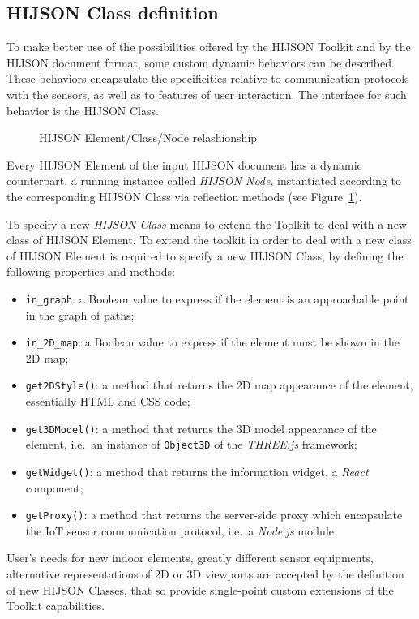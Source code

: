 \subsection{HIJSON Class definition}\label{hijson-class-definition}

To make better use of the possibilities offered by the HIJSON Toolkit and by the
HIJSON document format, some custom dynamic behaviors can be described. These
behaviors encapsulate the specificities relative to communication
protocols with the sensors, as well as to features of user interaction. The
interface for such behavior is the HIJSON Class.

\begin{figure}[!h]
\centering
{}
\caption{HIJSON Element/Class/Node relashionship}
\label{fig:elem-class-node-rel}
\end{figure}

Every HIJSON Element of the input HIJSON document has a dynamic
counterpart, a running instance called \emph{HIJSON Node}, instantiated
according to the corresponding HIJSON Class via reflection methods (see
Figure~\ref{fig:elem-class-node-rel}).

To specify a new \emph{HIJSON Class} means to extend the Toolkit to deal with a
new class of HIJSON Element.
To extend the toolkit in order to deal with a new class of HIJSON Element is
required to specify a new HIJSON Class, by defining the following
properties and methods:

\begin{itemize}
\item
 \texttt{in\_graph}: a Boolean value to express if the element is an
 approachable point in the graph of paths;
\item
 \texttt{in\_2D\_map}: a Boolean value to express if the element must 
 be shown in the 2D map;
\item
 \texttt{get2DStyle()}: a method that returns the 2D map appearance of
 the element, essentially HTML and CSS code;
\item
 \texttt{get3DModel()}: a method that returns the 3D model appearance of
 the element, i.e.~an instance of \texttt{Obj\-ect\-3D} of the \emph{THREE.js} 
 framework;
\item
 \texttt{getWidget()}: a method that returns the information widget, a
 \emph{React} component;
\item
 \texttt{getProxy()}: a method that returns the server-side proxy which
 encapsulate the IoT sensor communication protocol, i.e.~a \emph{Node.js}
 module.
\end{itemize}

User's needs for new indoor elements, greatly different sensor equipments,
alternative representations of 2D or 3D viewports are accepted by the
definition of new HIJSON Classes, that so provide single-point
custom extensions of the Toolkit capabilities.
